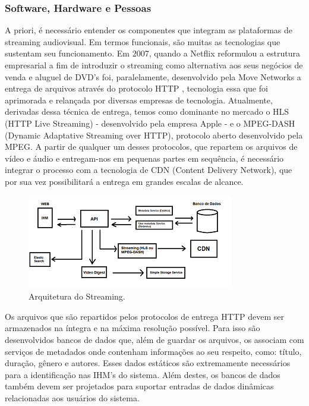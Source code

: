 \documentclass[conference]{IEEEtran}
\begin{document}
\subsubsection{Software, Hardware e Pessoas}
\label{sec: Software, Hardware e Pessoas}
A priori, é necessário entender os componentes que integram as plataformas de streaming audiovisual. Em termos funcionais, são muitas as tecnologias que sustentam seu funcionamento. Em 2007, quando a Netflix reformulou a estrutura empresarial a fim de introduzir o streaming como alternativa aos seus negócios de venda e aluguel de DVD’s \cite{b4} foi, paralelamente, desenvolvido pela Move Networks a entrega de arquivos através do protocolo HTTP \cite{b5}, tecnologia essa que foi aprimorada e relançada por diversas empresas de tecnologia. Atualmente, derivadas dessa técnica de entrega, temos como dominante no mercado o HLS (HTTP Live Streaming) - desenvolvido pela empresa Apple - e o MPEG-DASH (Dynamic Adaptative Streaming over HTTP), protocolo aberto desenvolvido pela MPEG. A partir de qualquer um desses protocolos, que repartem os arquivos de vídeo e áudio e entregam-nos em pequenas partes em sequência, é necessário integrar o processo com a tecnologia de CDN (Content Delivery Network), que por sua vez possibilitará a entrega em grandes escalas de alcance.

\begin{figure}[htbp]
\centerline{\includegraphics{fig1.png}}
\caption{Arquitetura do Streaming.}
\label{fig}
\end{figure}

Os arquivos que são repartidos pelos protocolos de entrega HTTP devem ser armazenados na íntegra e na máxima resolução possível. Para isso são desenvolvidos bancos de dados que, além de guardar os arquivos, os associam com serviços de metadados onde contenham informações ao seu respeito, como: título, duração, gênero e autores. Esses dados estáticos são extremamente necessários para a identificação nas IHM's do sistema. Além destes, os bancos de dados também devem ser projetados para suportar entradas de dados dinâmicas relacionadas aos usuários do sistema.
\end{document}
